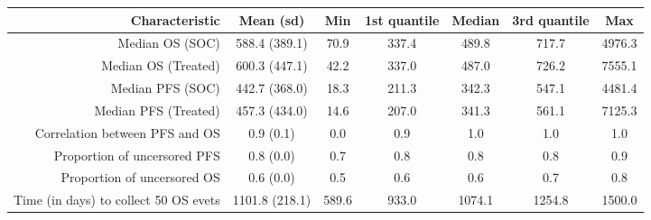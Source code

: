 \begin{tabular}{r|cccccc} 
\toprule 
Characteristic                        & Mean (sd)      & Min   & 1st quantile & Median & 3rd quantile & Max    \\
\midrule 
Median OS (SOC)                       & 588.4 (389.1)  & 70.9  & 337.4        & 489.8  & 717.7        & 4976.3 \\
Median OS (Treated)                   & 600.3 (447.1)  & 42.2  & 337.0        & 487.0  & 726.2        & 7555.1 \\
Median PFS (SOC)                      & 442.7 (368.0)  & 18.3  & 211.3        & 342.3  & 547.1        & 4481.4 \\
Median PFS (Treated)                  & 457.3 (434.0)  & 14.6  & 207.0        & 341.3  & 561.1        & 7125.3 \\
Correlation between PFS and OS        & 0.9 (0.1)      & 0.0   & 0.9          & 1.0    & 1.0          & 1.0    \\
Proportion of uncersored PFS          & 0.8 (0.0)      & 0.7   & 0.8          & 0.8    & 0.8          & 0.9    \\
Proportion of uncersored OS           & 0.6 (0.0)      & 0.5   & 0.6          & 0.6    & 0.7          & 0.8    \\
Time (in days) to collect 50 OS evets & 1101.8 (218.1) & 589.6 & 933.0        & 1074.1 & 1254.8       & 1500.0 \\
\bottomrule 
\end{tabular}
